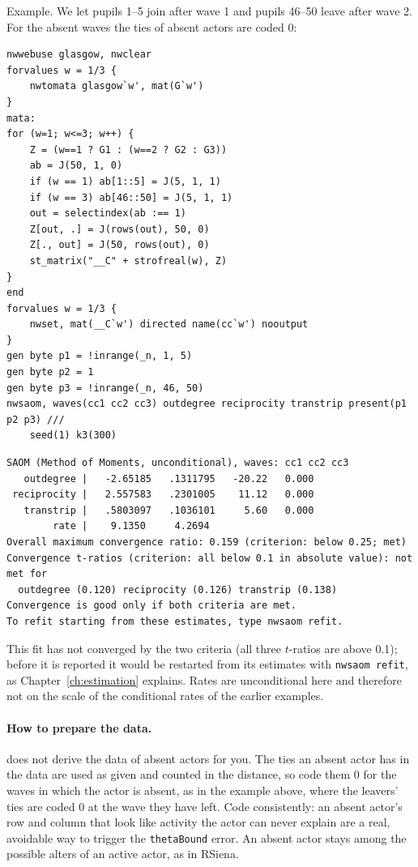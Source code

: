 Example. We let pupils 1--5 join after wave 1 and pupils 46--50 leave after wave 2. For the absent waves the ties of absent actors are coded 0:

\begin{lstlisting}
nwwebuse glasgow, nwclear
forvalues w = 1/3 {
    nwtomata glasgow`w', mat(G`w')
}
mata:
for (w=1; w<=3; w++) {
    Z = (w==1 ? G1 : (w==2 ? G2 : G3))
    ab = J(50, 1, 0)
    if (w == 1) ab[1::5] = J(5, 1, 1)
    if (w == 3) ab[46::50] = J(5, 1, 1)
    out = selectindex(ab :== 1)
    Z[out, .] = J(rows(out), 50, 0)
    Z[., out] = J(50, rows(out), 0)
    st_matrix("__C" + strofreal(w), Z)
}
end
forvalues w = 1/3 {
    nwset, mat(__C`w') directed name(cc`w') nooutput
}
gen byte p1 = !inrange(_n, 1, 5)
gen byte p2 = 1
gen byte p3 = !inrange(_n, 46, 50)
nwsaom, waves(cc1 cc2 cc3) outdegree reciprocity transtrip present(p1 p2 p3) ///
    seed(1) k3(300)
\end{lstlisting}
\begin{lstlisting}
SAOM (Method of Moments, unconditional), waves: cc1 cc2 cc3
   outdegree |   -2.65185   .1311795   -20.22   0.000
 reciprocity |   2.557583   .2301005    11.12   0.000
   transtrip |   .5803097   .1036101     5.60   0.000
        rate |    9.1350     4.2694
Overall maximum convergence ratio: 0.159 (criterion: below 0.25; met)
Convergence t-ratios (criterion: all below 0.1 in absolute value): not met for
  outdegree (0.120) reciprocity (0.126) transtrip (0.138)
Convergence is good only if both criteria are met.
To refit starting from these estimates, type nwsaom refit.
\end{lstlisting}
This fit has not converged by the two criteria (all three $t$-ratios are above 0.1); before it is reported it would be restarted from its estimates with \texttt{nwsaom refit}, as Chapter~\ref{ch:estimation} explains. Rates are unconditional here and therefore not on the scale of the conditional rates of the earlier examples.

\paragraph{How to prepare the data.} \nwsaom{} does not derive the data of absent actors for you. The ties an absent actor has in the data are used as given and counted in the distance, so code them 0 for the waves in which the actor is absent, as in the example above, where the leavers' ties are coded 0 at the wave they have left. Code consistently: an absent actor's row and column that look like activity the actor can never explain are a real, avoidable way to trigger the \texttt{thetaBound} error. An absent actor stays among the possible alters of an active actor, as in RSiena.

